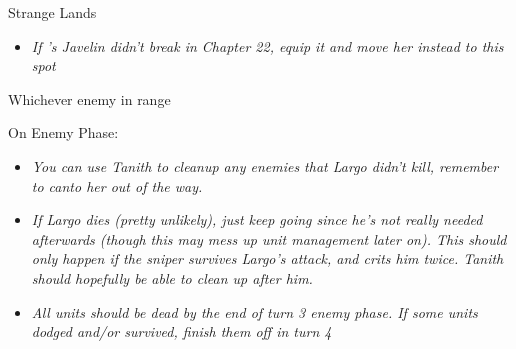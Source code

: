 \begin{battle}{Strange Lands}
\begin{multicols}{2}
\begin{enumerate}
{{\begin{itemize}
        \item \textit{If \tanith's Javelin didn't break in Chapter 22, equip it and move her instead to this spot}
    \end{itemize} }{Whichever enemy in range}{}
    \item On Enemy Phase:
}
\end{enumerate}
\vspace{3mm}
\begin{itemize}
    \item \textit{You can use Tanith to cleanup any enemies that Largo didn’t kill, remember to canto her out of the way.}
    \item \textit{If Largo dies (pretty unlikely), just keep going since he’s not really needed afterwards (though this may mess up unit management later on). This should only happen if the sniper survives Largo’s attack, and crits him twice. Tanith should hopefully be able to clean up after him.}
    \item \textit{All units should be dead by the end of turn 3 enemy phase. If some units dodged and/or survived, finish them off in turn 4}
\end{itemize}
\end{multicols}
\end{battle}